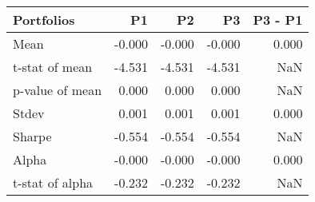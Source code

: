 \begin{tabular}{lrrrr}
\toprule
Portfolios & P1 & P2 & P3 & P3 - P1 \\
\midrule
Mean & -0.000 & -0.000 & -0.000 & 0.000 \\
t-stat of mean & -4.531 & -4.531 & -4.531 & NaN \\
p-value of mean & 0.000 & 0.000 & 0.000 & NaN \\
Stdev & 0.001 & 0.001 & 0.001 & 0.000 \\
Sharpe & -0.554 & -0.554 & -0.554 & NaN \\
Alpha & -0.000 & -0.000 & -0.000 & 0.000 \\
t-stat of alpha & -0.232 & -0.232 & -0.232 & NaN \\
\bottomrule
\end{tabular}
